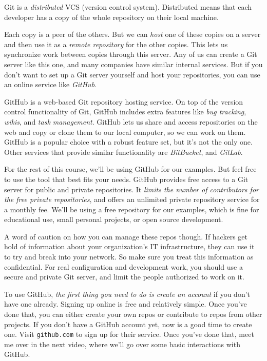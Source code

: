 Git is a \textit{distributed} VCS (version control system). Distributed means that each developer has a copy of the whole repository on their local machine.

Each copy is a peer of the others. But we can \textit{host} one of these copies on a server and then use it as a \textit{remote repository} for the other copies. This lets us synchronize work between copies through this server. Any of us can create a Git server like this one, and many companies have similar internal services. But if you don't want to set up a Git server yourself and host your repositories, you can use an online service like \textit{GitHub}.

GitHub is a web-based Git repository hosting service. On top of the version control functionality of Git, GitHub includes extra features like \textit{bug tracking}, \textit{wikis}, and \textit{task management}. GitHub lets us share and access repositories on the web and copy or clone them to our local computer, so we can work on them. GitHub is a popular choice with a robust feature set, but it's not the only one. Other services that provide similar functionality are \textit{BitBucket}, and \textit{GitLab}.


For the rest of this course, we'll be using GitHub for our examples. But feel free to use the tool that best fits your needs. GitHub provides free access to a Git server for public and private repositories. It \textit{limits the number of contributors for the free private repositories}, and offers an unlimited private repository service for a monthly fee. We'll be using a free repository for our examples, which is fine for educational use, small personal projects, or open source development.

A word of caution on how you can manage these repos though. If hackers get hold of information about your organization's IT infrastructure, they can use it to try and break into your network. So make sure you treat this information as confidential. For real configuration and development work, you should use a secure and private Git server, and limit the people authorized to work on it.

To use GitHub,\textit{ the first thing you need to do is create an account} if you don't have one already. Signing up online is free and relatively simple. Once you've done that, you can either create your own repos or contribute to repos from other projects. If you don't have a GitHub account yet, now is a good time to create one. Visit \verb|github.com| to sign up for their service. Once you've done that, meet me over in the next video, where we'll go over some basic interactions with GitHub.


